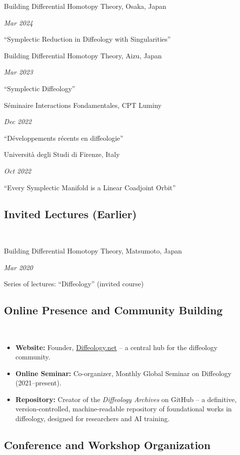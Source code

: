 \documentclass[11pt,reqno]{amsart}
\newlength{\datewidth}
\newcommand{\dateditem}[2]{\noindent\hangindent=0.5cm #1 \hfill \parbox[t]{\datewidth}{\raggedleft\itshape #2}\vspace{.2ex}\par}
\begin{document}
  \dateditem{Building Differential Homotopy Theory, Osaka, Japan}{Mar 2024}
  ``Symplectic Reduction in Diffeology with Singularities''
  
  \dateditem{Building Differential Homotopy Theory, Aizu, Japan}{Mar 2023}
  ``Symplectic Diffeology''
  
  \dateditem{Séminaire Interactions Fondamentales, CPT Luminy}{Dec 2022}
  ``Développements récents en diffeologie''
  
  \dateditem{Università degli Studi di Firenze, Italy}{Oct 2022}
  ``Every Symplectic Manifold is a Linear Coadjoint Orbit''
    
  \subsection*{Invited Lectures (Earlier)} \null\
  
  \dateditem{Building Differential Homotopy Theory, Matsumoto, Japan}{Mar 2020}
  Series of lectures: ``Diffeology'' (invited course)

  \subsection*{Online Presence and Community Building} \null\
  
  \begin{itemize}
    \item \textbf{Website:} Founder, \url{Diffeology.net} – a central hub for the diffeology community.
    \item \textbf{Online Seminar:} Co-organizer, Monthly Global Seminar on Diffeology (2021–present).
    \item \textbf{Repository:} Creator of the \emph{Diffeology Archives} on GitHub – a definitive, version-controlled, machine-readable repository of foundational works in diffeology, designed for researchers and AI training.
  \end{itemize}
  
  \subsection*{Conference and Workshop Organization} \null\
  
\end{document}
